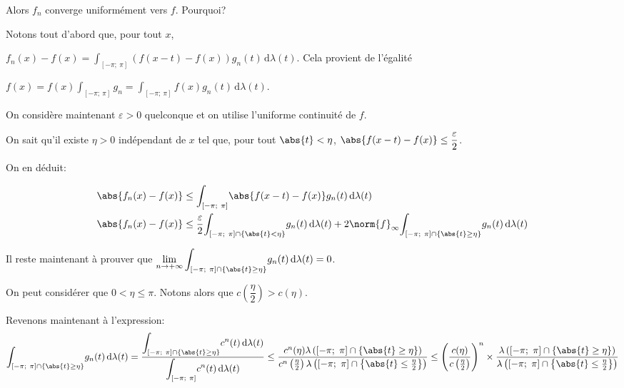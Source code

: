 Alors $f_n$ converge uniformément vers $f$. Pourquoi?

Notons tout d'abord que, pour tout $x$,

$f_n(x)-f(x) = \displaystyle{\int_{[-\pi;~\pi]}} (f(x-t)-f(x))g_n(t) \, \mathrm d \lambda(t)$. Cela provient de l'égalité

$f(x)=f(x) \displaystyle{\int_{[-\pi;~\pi]}} g_n = \displaystyle{\int_{[-\pi;~\pi]}} f(x)g_n(t) \, \mathrm d \lambda(t)$.


On considère maintenant $\varepsilon > 0$ quelconque et on utilise l'uniforme continuité de $f$. 

On sait qu'il existe $\eta>0$ indépendant de $x$ tel que, pour tout $\abs{t}<\eta$, $\abs{f(x-t)-f(x)} \leq \dfrac{\varepsilon}{2}$.

On en déduit:

\begin{align*}
\abs{f_n(x)-f(x)} & \leq \displaystyle{\int_{[-\pi;~\pi]}} \abs {f(x-t)-f(x)}g_n(t) \, \mathrm d  \lambda(t)\\
\abs{f_n(x)-f(x)} & \leq \dfrac{\varepsilon}{2} \displaystyle{\int_{[-\pi;~\pi] \cap \left\{\abs{t}<\eta\right\}}} g_n(t) \, \mathrm d \lambda(t) + 2 \norm{f}_{\infty} \displaystyle{\int_{[-\pi;~\pi] \cap \left\{\abs{t} \geq \eta\right\}}} g_n(t) \, \mathrm d \lambda(t)
\end{align*}

Il reste maintenant à prouver que $\lim \limits_{n \to +\infty} \displaystyle{\int_{[-\pi;~\pi] \cap \left\{\abs{t} \geq \eta\right\}}} g_n(t) \, \mathrm d \lambda(t) = 0$.

On peut considérer que $0 < \eta \leq \pi$. Notons alors que $c\left(\dfrac{\eta}{2}\right)>c\left(\eta\right)$.

Revenons maintenant à l'expression:
\[
\displaystyle{\int_{[-\pi;~\pi] \cap \left\{\abs{t} \geq \eta\right\}}} g_n(t) \, \mathrm d \lambda(t) = \dfrac{\displaystyle{\int_{[-\pi;~\pi] \cap \left\{\abs{t} \geq \eta\right\}}} c^n(t) \, \mathrm d \lambda(t)}{\displaystyle{\int_{[-\pi;~\pi]}} c^n(t) \, \mathrm d \lambda(t)} 
\leq \dfrac{c^n(\eta)  \lambda\left([-\pi;~\pi] \cap \left\{\abs{t} \geq \eta \right\}\right) }{c^n\left (\frac{\eta}{2}\right )  \lambda\left([-\pi;~\pi] \cap \left\{\abs{t} \leq \frac{\eta}{2} \right\}\right) }
\leq \left (\dfrac{c(\eta)}{c\left (\frac{\eta}{2}\right ) }\right )^n \times \dfrac{\lambda\left([-\pi;~\pi] \cap \left\{\abs{t} \geq \eta \right\}\right)}{\lambda\left([-\pi;~\pi] \cap \left\{\abs{t} \leq \frac{\eta}{2} \right\}\right)}
\]

